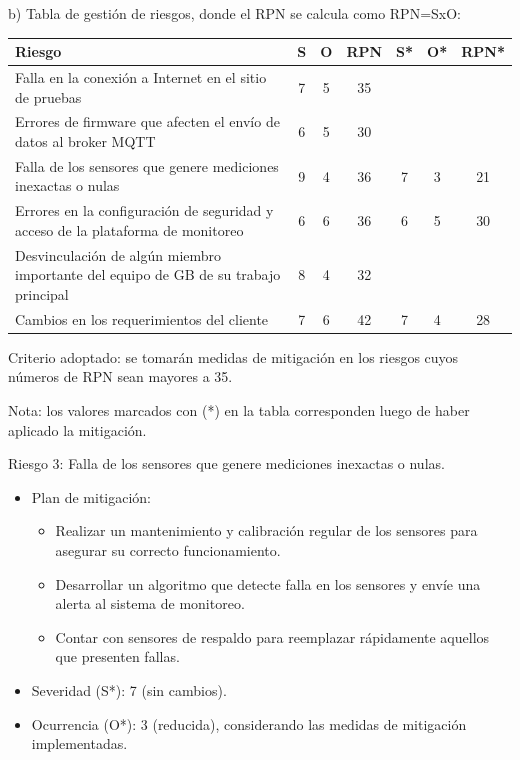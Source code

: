 \documentclass[
11pt, %
]{charter}
\begin{document}
b) Tabla de gestión de riesgos, donde el RPN se calcula como RPN=SxO:

\begin{table}[htpb]
\centering
\begin{tabularx}{\linewidth}{@{}|X|c|c|c|c|c|c|@{}}
\hline
\rowcolor[HTML]{C0C0C0}
Riesgo & S & O & RPN & S* & O* & RPN* \\ \hline

Falla en la conexión a Internet en el sitio de pruebas & 7 & 5 & 35 & & & \\ \hline
Errores de firmware que afecten el envío de datos al broker MQTT & 6 & 5 & 30 & & & \\ \hline
Falla de los sensores que genere mediciones inexactas o nulas & 9 & 4 & 36 & 7 & 3 & 21 \\ \hline
Errores en la configuración de seguridad y acceso de la plataforma de monitoreo & 6 & 6 & 36 & 6 & 5 & 30 \\ \hline
Desvinculación de algún miembro importante del equipo de GB de su trabajo principal & 8 & 4 & 32 & & & \\ \hline
Cambios en los requerimientos del cliente & 7 & 6 & 42 & 7 & 4 & 28 \\ \hline
\end{tabularx}%
\end{table}

Criterio adoptado: se tomarán medidas de mitigación en los riesgos cuyos números de RPN sean
mayores a 35.

Nota: los valores marcados con (*) en la tabla corresponden luego de haber aplicado la mitigación.

\pagebreak
Riesgo 3: Falla de los sensores que genere mediciones inexactas o nulas.
\begin{itemize}
	\item Plan de mitigación: 
        \begin{itemize}
	       \item Realizar un mantenimiento y calibración regular de los sensores para asegurar su correcto funcionamiento. 
	       \item Desarrollar un algoritmo que detecte falla en los sensores y envíe una alerta al sistema de monitoreo. 
	       \item Contar con sensores de respaldo para reemplazar rápidamente aquellos que presenten fallas.
        \end{itemize}
	\item Severidad (S*): 7 (sin cambios).
	\item Ocurrencia (O*): 3 (reducida), considerando las medidas de mitigación implementadas.
\end{itemize}
\end{document}
